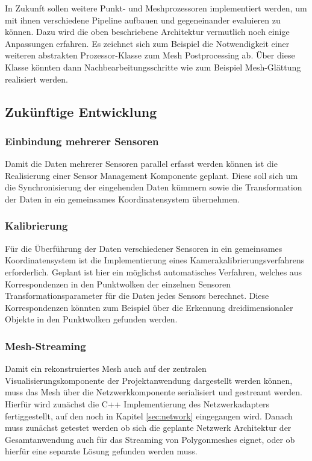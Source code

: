In Zukunft sollen weitere Punkt- und Meshprozessoren implementiert werden, um mit ihnen verschiedene Pipeline aufbauen und gegeneinander evaluieren zu können. Dazu wird die oben beschriebene Architektur vermutlich noch einige Anpassungen erfahren. Es zeichnet sich zum Beispiel die Notwendigkeit einer weiteren abstrakten  Prozessor-Klasse zum Mesh Postprocessing ab. Über diese Klasse könnten dann Nachbearbeitungsschritte wie zum Beispiel Mesh-Glättung realisiert werden.

\subsection{Zukünftige Entwicklung}
\subsubsection{Einbindung mehrerer Sensoren}
Damit die Daten mehrerer Sensoren parallel erfasst werden können ist die Realisierung einer Sensor Management Komponente geplant. Diese soll sich um die Synchronisierung der eingehenden Daten kümmern sowie die Transformation der Daten in ein gemeinsames Koordinatensystem übernehmen.

\subsubsection{Kalibrierung}
Für die Überführung der Daten verschiedener Sensoren in ein gemeinsames Koordinatensystem ist die Implementierung eines Kamerakalibrierungsverfahrens erforderlich. Geplant ist hier ein möglichst automatisches Verfahren, welches aus Korrespondenzen in den Punktwolken der einzelnen Sensoren Transformationsparameter für die Daten jedes Sensors berechnet. Diese Korrespondenzen könnten zum Beispiel über die Erkennung dreidimensionaler Objekte in den Punktwolken gefunden werden.

\subsubsection{Mesh-Streaming}
Damit ein rekonstruiertes Mesh auch auf der zentralen Visualisierungskomponente der Projektanwendung dargestellt werden können, muss das Mesh über die Netzwerkkomponente serialisiert und gestreamt werden. Hierfür wird zunächst die C++ Implementierung des Netzwerkadapters fertiggestellt, auf den noch in Kapitel \ref{sec:network} eingegangen wird. Danach muss zunächst getestet werden ob sich die geplante Netzwerk Architektur der Gesamtanwendung auch für das Streaming von Polygonmeshes eignet, oder ob hierfür eine separate Lösung gefunden werden muss.

